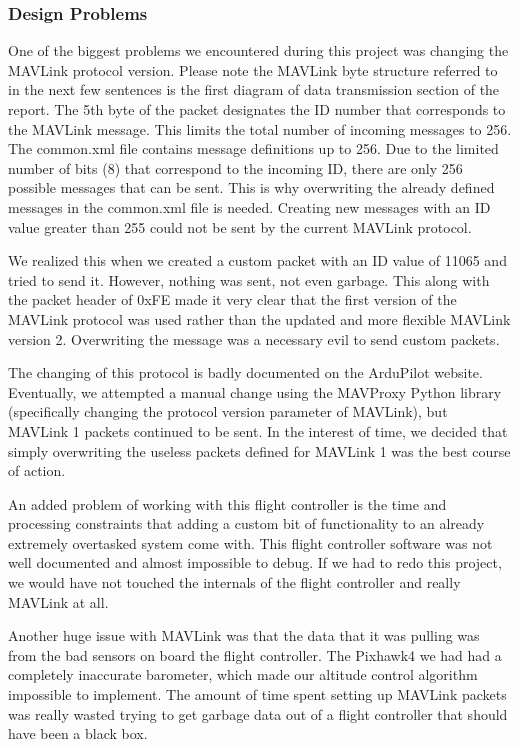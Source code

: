 \documentclass[12pt,journal,compsoc]{IEEEtran}
\begin{document}
\subsubsection{Design Problems}
One of the biggest problems we encountered during this project was changing the MAVLink protocol version. Please note the MAVLink byte structure referred to in the next few sentences is the first diagram of data transmission section of the report. The 5th byte of the packet designates the ID number that corresponds to the MAVLink message. This limits the total number of incoming messages to 256. The common.xml file contains message definitions up to 256. Due to the limited number of bits (8) that correspond to the incoming ID, there are only 256 possible messages that can be sent. This is why overwriting the already defined messages in the common.xml file is needed. Creating new messages with an ID value greater than 255 could not be sent by the current MAVLink protocol.

We realized this when we created a custom packet with an ID value of 11065 and tried to send it. However, nothing was sent, not even garbage. This along with the packet header of 0xFE made it very clear that the first version of the MAVLink protocol was used rather than the updated and more flexible MAVLink version 2. Overwriting the message was a necessary evil to send custom packets. 

The changing of this protocol is badly documented on the ArduPilot website. Eventually, we attempted a manual change using the MAVProxy Python library (specifically changing the protocol version parameter of MAVLink), but MAVLink 1 packets continued to be sent. In the interest of time, we decided that simply overwriting the useless packets defined for MAVLink 1 was the best course of action.

An added problem of working with this flight controller is the time and processing constraints that adding a custom bit of functionality to an already extremely overtasked system come with. This flight controller software was not well documented and almost impossible to debug. If we had to redo this project, we would have not touched the internals of the flight controller and really MAVLink at all.

Another huge issue with MAVLink was that the data that it was pulling was from the bad sensors on board the flight controller. The Pixhawk4 we had had a completely inaccurate barometer, which made our altitude control algorithm impossible to implement. The amount of time spent setting up MAVLink packets was really wasted trying to get garbage data out of a flight controller that should have been a black box. 
\end{document}
